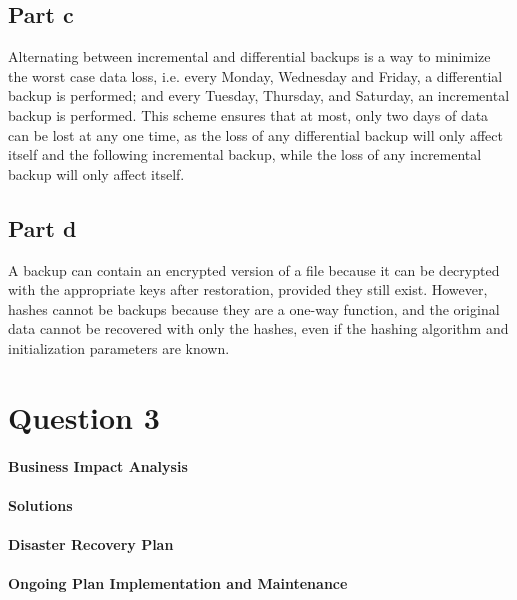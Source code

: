 \documentclass[12pt,a4paper]{article}
\begin{document}
\subsection{Part c}
Alternating between incremental and differential backups is a way to minimize the worst case data loss, i.e. every Monday, Wednesday and Friday, a differential backup is performed; and every Tuesday, Thursday, and Saturday, an incremental backup is performed. This scheme ensures that at most, only two days of data can be lost at any one time, as the loss of any differential backup will only affect itself and the following incremental backup, while the loss of any incremental backup will only affect itself.

\subsection{Part d}
A backup can contain an encrypted version of a file because it can be decrypted with the appropriate keys after restoration, provided they still exist. However, hashes cannot be backups because they are a one-way function, and the original data cannot be recovered with only the hashes, even if the hashing algorithm and initialization parameters are known.

\section{Question 3}
\paragraph{Business Impact Analysis}
\paragraph{Solutions}
\paragraph{Disaster Recovery Plan}
\paragraph{Ongoing Plan Implementation and Maintenance}
\end{document}

